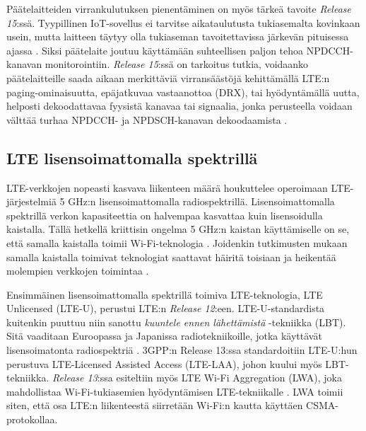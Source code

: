 \documentclass[finnish, 12pt, a4paper, elec, latin1, utf8, online]{aaltothesis}
\begin{document}
Päätelaitteiden virrankulutuksen pienentäminen on myös tärkeä tavoite \textit{Release 15}:ssä. Tyypillinen IoT-sovellus ei tarvitse aikataulutusta tukiasemalta kovinkaan usein, mutta laitteen täytyy olla tukiaseman tavoitettavissa järkevän pituisessa ajassa \cite{ratasuk2017enhancements}. Siksi päätelaite joutuu käyttämään suhteellisen paljon tehoa NPDCCH-kanavan monitorointiin. \textit{Release 15}:ssä on tarkoitus tutkia, voidaanko päätelaitteille saada aikaan merkittäviä virransäästöjä kehittämällä LTE:n paging-ominaisuutta, epäjatkuvaa vastaanottoa (DRX), tai hyödyntämällä uutta, helposti dekoodattavaa fyysistä kanavaa tai signaalia, jonka perusteella voidaan välttää turhaa NPDCCH- ja NPDSCH-kanavan dekoodaamista \cite{ratasuk2017enhancements}.

\subsection{LTE lisensoimattomalla spektrillä}

LTE-verkkojen nopeasti kasvava liikenteen määrä houkuttelee operoimaan LTE-järjestelmiä 5 GHz:n lisensoimattomalla radiospektrillä. Lisensoimattomalla spektrillä verkon kapasiteettia on halvempaa kasvattaa kuin lisensoidulla kaistalla. Tällä hetkellä kriittisin ongelma 5 GHz:n kaistan käyttämiselle on se, että samalla kaistalla toimii Wi-Fi-teknologia \cite{ismaiel2017survey}. Joidenkin tutkimusten mukaan samalla kaistalla toimivat teknologiat saattavat häiritä toisiaan ja heikentää molempien verkkojen toimintaa \cite{naik2018coexistence, ismaiel2017survey}.

Ensimmäinen lisensoimattomalla spektrillä toimiva LTE-teknologia, LTE Unlicensed (LTE-U), perustui LTE:n \textit{Release 12}:een. LTE-U-standardista kuitenkin puuttuu niin sanottu \textit{kuuntele ennen lähettämistä} -tekniikka (LBT). Sitä vaaditaan Euroopassa ja Japanissa radiotekniikoille, jotka käyttävät lisensoimatonta radiospektriä \cite{ismaiel2017survey}. 3GPP:n Release 13:ssa standardoitiin LTE-U:hun perustuva LTE-Licensed Assisted Access (LTE-LAA), johon kuului myös LBT-tekniikka. \textit{Release 13}:ssa esiteltiin myös LTE Wi-Fi Aggregation (LWA), joka mahdollistaa Wi-Fi-tukiasemien hyödyntämisen LTE-tekniikalle \cite{ismaiel2017survey}. LWA toimii siten, että osa LTE:n liikenteestä siirretään Wi-Fi:n kautta käyttäen CSMA-protokollaa.
\end{document}
